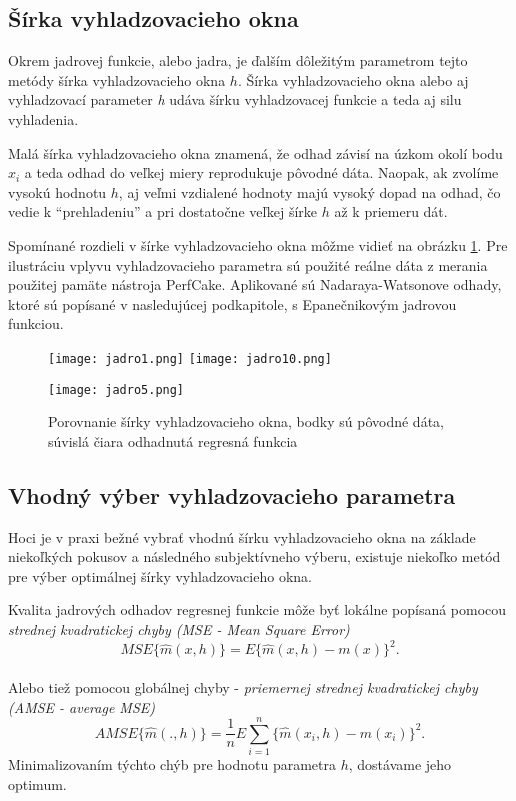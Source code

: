 \subsection{Šírka vyhladzovacieho okna}

Okrem jadrovej funkcie, alebo jadra, je ďalším dôležitým parametrom tejto metódy šírka vyhladzovacieho okna $h$. Šírka vyhladzovacieho okna alebo aj vyhladzovací parameter \textit{h} udáva šírku vyhladzovacej funkcie a teda aj silu vyhladenia. 

Malá šírka vyhladzovacieho okna znamená, že odhad závisí na úzkom okolí bodu $x_i$ a teda odhad do veľkej miery reprodukuje pôvodné dáta. Naopak, ak zvolíme vysokú hodnotu $h$, aj veľmi vzdialené hodnoty majú vysoký dopad na odhad, čo vedie k ``prehladeniu'' a pri dostatočne veľkej šírke $h$ až k priemeru dát.

 Spomínané rozdieli v šírke vyhladzovacieho okna môžme vidieť na obrázku \ref{porovnanieSirky}. Pre ilustráciu vplyvu vyhladzovacieho parametra sú použité reálne dáta z merania použitej pamäte nástroja PerfCake. Aplikované sú Nadaraya-Watsonove odhady, ktoré sú popísané v nasledujúcej podkapitole, s Epanečnikovým jadrovou funkciou. 
 
 \begin{figure}[!ht]
  \texttt{[image: jadro1.png]}
  \hspace{15px}
  \texttt{[image: jadro10.png]}
   
   \vspace{30px}
   
  \centering
  \texttt{[image: jadro5.png]}
  \caption{Porovnanie šírky vyhladzovacieho okna, bodky sú pôvodné dáta, súvislá čiara odhadnutá regresná funkcia}\label{porovnanieSirky}
\end{figure}

\subsection{Vhodný výber vyhladzovacieho parametra}
Hoci je v praxi bežné vybrať vhodnú šírku vyhladzovacieho okna na základe niekoľkých pokusov a následného subjektívneho výberu, existuje niekoľko metód pre výber optimálnej šírky vyhladzovacieho okna.

Kvalita jadrových odhadov regresnej funkcie môže byť lokálne popísaná pomocou \textit{strednej kvadratickej chyby (MSE - Mean Square Error)}
\begin{equation*}
MSE\{\hat{m}(x,h)\} = E{\{\hat{m}(x,h) - m(x)\}}^2.
\end{equation*} 
\\
Alebo tiež pomocou globálnej chyby - \textit{priemernej strednej kvadratickej chyby (AMSE - average MSE)}
\begin{equation*}
AMSE\{\hat{m}(.,h)\} = \frac{1}{n}E\sum\limits_{i=1}^{n} {\{\hat{m}(x_i,h) - m(x_i)\}}^2.
\end{equation*}
Minimalizovaním týchto chýb pre hodnotu parametra $h$, dostávame jeho optimum.

